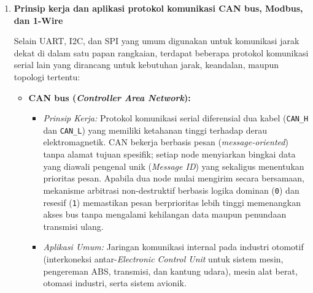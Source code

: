 \begin{enumerate}[label=\textbf{\arabic*.}, leftmargin=*, itemsep=10pt]
    Pada saat jalur berada dalam kondisi diam (\textit{idle}), level tegangan berada pada logika tinggi (\texttt{HIGH}). Komunikasi dimulai ketika pengirim menurunkan tegangan ke logika rendah (\texttt{LOW}) sebagai tanda \textit{start bit}. Begitu mendeteksi transisi turun tersebut, penerima menyalakan pencacah waktu internalnya dan melakukan pencuplikan (\textit{sampling}) logika tepat di bagian tengah setiap interval waktu bit ($T_{\text{bit}}$) untuk membaca bit data ke-0 hingga ke-7 serta memverifikasi \textit{stop bit} pada akhir bingkai. Jika \textit{baud rate} pengirim dan penerima berbeda, interval waktu pencuplikan penerima menjadi lebih cepat atau lebih lambat dibandingkan lebar bit aktual yang dikirimkan. Pergeseran fasa waktu (\textit{timing drift}) ini terakumulasi pada setiap bit berikutnya sehingga penerima mencuplik posisi bit yang keliru, gagal mengenali posisi \textit{stop bit} (\textit{framing error}), dan menghasilkan data yang rusak atau tidak terbaca dengan benar.

    \item \textbf{Prinsip kerja dan aplikasi protokol komunikasi CAN bus, Modbus, dan 1-Wire}

    Selain UART, I2C, dan SPI yang umum digunakan untuk komunikasi jarak dekat di dalam satu papan rangkaian, terdapat beberapa protokol komunikasi serial lain yang dirancang untuk kebutuhan jarak, keandalan, maupun topologi tertentu:
    \begin{itemize}
        \item \textbf{CAN bus (\textit{Controller Area Network}):}
        \begin{itemize}
            \item \textit{Prinsip Kerja:} Protokol komunikasi serial diferensial dua kabel (\texttt{CAN\_H} dan \texttt{CAN\_L}) yang memiliki ketahanan tinggi terhadap derau elektromagnetik. CAN bekerja berbasis pesan (\textit{message-oriented}) tanpa alamat tujuan spesifik; setiap node menyiarkan bingkai data yang diawali pengenal unik (\textit{Message ID}) yang sekaligus menentukan prioritas pesan. Apabila dua node mulai mengirim secara bersamaan, mekanisme arbitrasi non-destruktif berbasis logika dominan (\texttt{0}) dan resesif (\texttt{1}) memastikan pesan berprioritas lebih tinggi memenangkan akses bus tanpa mengalami kehilangan data maupun penundaan transmisi ulang.
            \item \textit{Aplikasi Umum:} Jaringan komunikasi internal pada industri otomotif (interkoneksi antar-\textit{Electronic Control Unit} untuk sistem mesin, pengereman ABS, transmisi, dan kantung udara), mesin alat berat, otomasi industri, serta sistem avionik.
        \end{itemize}


\end{itemize}
\end{enumerate}
